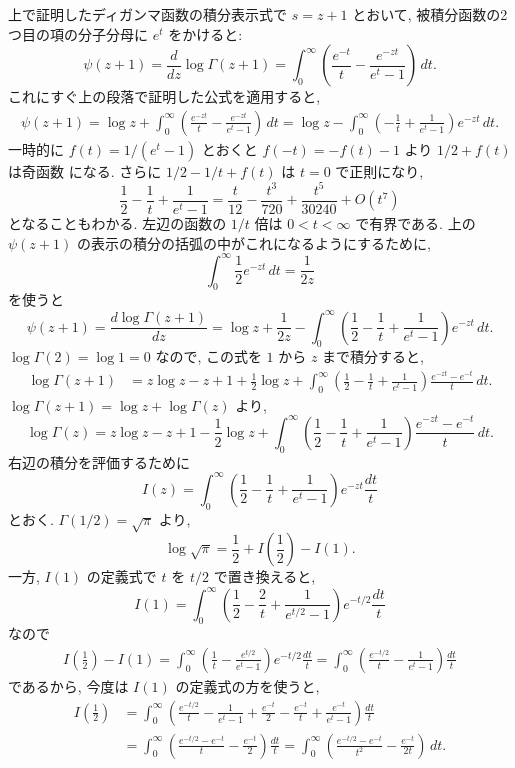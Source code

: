 \documentclass[12pt,twoside]{jarticle}
\theoremstyle{jplain}
\theoremstyle{jplain}
\theoremstyle{jplain}
\numberwithin{theorem}{section}
\numberwithin{equation}{section}
\numberwithin{figure}{section}
\numberwithin{table}{section}
\begin{document}
上で証明したディガンマ函数の積分表示式で $s=z+1$ とおいて,
被積分函数の2つ目の項の分子分母に $e^t$ をかけると:
\[
\psi(z+1)=\frac{d}{dz}\log\Gamma(z+1)
=\int_0^\infty\left( \frac{e^{-t}}{t}-\frac{e^{-zt}}{e^t-1}\right)\,dt.
\]
これにすぐ上の段落で証明した公式を適用すると,
\begin{align*}
\psi(z+1)
=\log z + \int_0^\infty\left(\frac{e^{-zt}}{t}-\frac{e^{-zt}}{e^t-1}\right)\,dt
=\log z - \int_0^\infty\left(-\frac{1}{t}+\frac{1}{e^t-1}\right)e^{-zt}\,dt.
\end{align*}
一時的に $f(t)=1/(e^t-1)$ とおくと $f(-t)=-f(t)-1$ より $1/2+f(t)$ は奇函数
になる. さらに $1/2-1/t+f(t)$ は $t=0$ で正則になり,
\[
\frac{1}{2}-\frac{1}{t}+\frac{1}{e^t-1}
=\frac{t}{12}-\frac{t^3}{720}+\frac{t^5}{30240}+O(t^7)
\tag{$*$}
\]
となることもわかる. 左辺の函数の $1/t$ 倍は $0<t<\infty$ で有界である.
上の $\psi(z+1)$ の表示の積分の括弧の中がこれになるようにするために,
\[
\int_0^\infty \frac{1}{2}e^{-zt}\,dt = \frac{1}{2z}
\]
を使うと
\[
\psi(z+1)=\frac{d\log\Gamma(z+1)}{dz}
=\log z+\frac{1}{2z}
-\int_0^\infty\left(\frac{1}{2}-\frac{1}{t}+\frac{1}{e^t-1}\right)e^{-zt}\,dt.
\]
$\log\Gamma(2)=\log 1=0$ なので, この式を $1$ から $z$ まで積分すると,
\begin{align*}
\log\Gamma(z+1)
&=z\log z-z+1 + \frac{1}{2}\log z
+\int_0^\infty\left(\frac{1}{2}-\frac{1}{t}+\frac{1}{e^t-1}\right)\frac{e^{-zt}-e^{-t}}{t}\,dt.
\end{align*}
$\log\Gamma(z+1)=\log z+\log\Gamma(z)$ より,
\[
\log\Gamma(z)
=z\log z-z+1 - \frac{1}{2}\log z
+\int_0^\infty\left(\frac{1}{2}-\frac{1}{t}+\frac{1}{e^t-1}\right)\frac{e^{-zt}-e^{-t}}{t}\,dt.
\]
右辺の積分を評価するために
\[
I(z)
=\int_0^\infty\left(\frac{1}{2}-\frac{1}{t}+\frac{1}{e^t-1}\right)e^{-zt}\frac{dt}{t}
\]
とおく. $\Gamma(1/2)=\sqrt{\pi}$ より,
\[
\log\sqrt{\pi}=\frac{1}{2}+I\left(\frac{1}{2}\right)-I(1).
\]
一方, $I(1)$ の定義式で $t$ を $t/2$ で置き換えると,
\[
I(1)
=\int_0^\infty\left(\frac{1}{2}-\frac{2}{t}+\frac{1}{e^{t/2}-1}\right)e^{-t/2}\frac{dt}{t}
\]
なので
\begin{align*}
I\left(\frac{1}{2}\right)-I(1)
=\int_0^\infty\left(\frac{1}{t}-\frac{e^{t/2}}{e^t-1}\right)e^{-t/2}\frac{dt}{t}
=\int_0^\infty\left(\frac{e^{-t/2}}{t}-\frac{1}{e^t-1}\right)\frac{dt}{t}
\end{align*}
であるから, 今度は $I(1)$ の定義式の方を使うと,
\begin{align*}
I\left(\frac{1}{2}\right)
&
=\int_0^\infty\left(
  \frac{e^{-t/2}}{t}-\frac{1}{e^t-1}
 +\frac{e^{-t}}{2}-\frac{e^{-t}}{t}+\frac{e^{-t}}{e^t-1}
\right)\frac{dt}{t}
\\ &
=\int_0^\infty\left(
  \frac{e^{-t/2}-e^{-t}}{t}-\frac{e^{-t}}{2}
\right)\frac{dt}{t}
=\int_0^\infty\left(
  \frac{e^{-t/2}-e^{-t}}{t^2}-\frac{e^{-t}}{2t}
\right)\,dt.
\end{align*}
\end{document}
